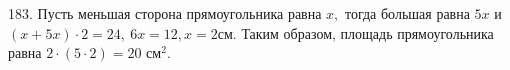183. Пусть меньшая сторона прямоугольника равна $x,$ тогда большая равна $5x$ и $(x+5x)\cdot2=24,\ 6x=12, x=2$см. Таким образом, площадь прямоугольника равна $2\cdot(5\cdot2)=20\text{ см}^2.$\\
